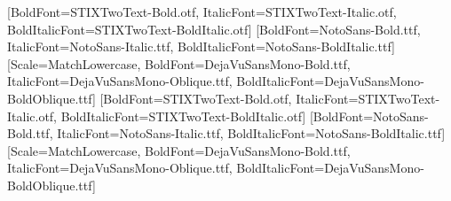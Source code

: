 
\newif\ifFinalVersion
\FinalVersionfalse

\usepackage{fontspec}
\usepackage{polyglossia}
\setmainlanguage{greek}
\setmainfont{STIXTwoText-Regular.otf}[BoldFont=STIXTwoText-Bold.otf, ItalicFont=STIXTwoText-Italic.otf,
  BoldItalicFont=STIXTwoText-BoldItalic.otf]
\setsansfont{NotoSans-Regular.ttf}[BoldFont=NotoSans-Bold.ttf,
  ItalicFont=NotoSans-Italic.ttf, BoldItalicFont=NotoSans-BoldItalic.ttf]
\setmonofont{DejaVuSansMono.ttf}[Scale=MatchLowercase,
  BoldFont=DejaVuSansMono-Bold.ttf, ItalicFont=DejaVuSansMono-Oblique.ttf,
  BoldItalicFont=DejaVuSansMono-BoldOblique.ttf]
\newfontfamily{}[BoldFont=STIXTwoText-Bold.otf, ItalicFont=STIXTwoText-Italic.otf,
  BoldItalicFont=STIXTwoText-BoldItalic.otf]
\newfontfamily{}[BoldFont=NotoSans-Bold.ttf,
  ItalicFont=NotoSans-Italic.ttf, BoldItalicFont=NotoSans-BoldItalic.ttf]
\newfontfamily{}[Scale=MatchLowercase,
  BoldFont=DejaVuSansMono-Bold.ttf, ItalicFont=DejaVuSansMono-Oblique.ttf,
  BoldItalicFont=DejaVuSansMono-BoldOblique.ttf]

\usepackage{amsmath,amssymb}
\usepackage{unicode-math}
\usepackage{newunicodechar}
\usepackage{siunitx}

